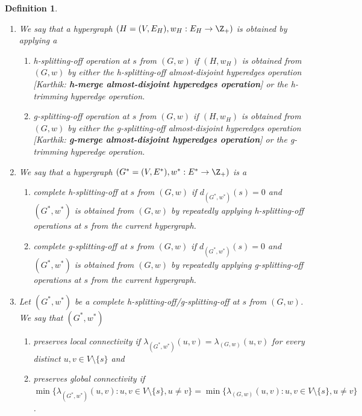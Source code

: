 \documentclass{article}
\newtheorem{definition}{Definition}[section]
\newcommand{\knote}[1]{{\color{red}[{\tiny Karthik: \bf #1}]\marginpar{\color{red}*}}}
\begin{document}
\begin{definition}
\begin{enumerate}
        
       \item We say that a hypergraph $(H=(V, E_H), w_H: E_H\rightarrow \Z_+)$ is obtained by applying a 
        \begin{enumerate}
            \item \emph{h-splitting-off operation at $s$ from $(G, w)$} if $(H, w_H)$ is obtained from $(G, w)$ by either the h-splitting-off almost-disjoint hyperedges operation \knote{h-merge almost-disjoint hyperedges operation} or the h-trimming hyperedge operation. 
            \item \emph{g-splitting-off operation at $s$ from $(G, w)$} if $(H, w_H)$ is obtained from $(G, w)$ by either the g-splitting-off almost-disjoint hyperedges operation \knote{g-merge almost-disjoint hyperedges operation} or the g-trimming hyperedge operation. 
        \end{enumerate}
        
        \item We say that a hypergraph $(G^*=(V, E^*), w^*: E^*\rightarrow \Z_+)$ is a 
        \begin{enumerate}
            \item \emph{complete h-splitting-off at $s$ from $(G, w)$} if $d_{(G^*, w^*)}(s) = 0$ and $(G^*, w^*)$ is obtained from $(G, w)$ by repeatedly applying h-splitting-off operations at $s$ from the current hypergraph. 
            \item \emph{complete g-splitting-off at $s$ from $(G, w)$} if $d_{(G^*, w^*)}(s) = 0$ and $(G^*, w^*)$ is obtained from $(G, w)$ by repeatedly applying g-splitting-off operations at $s$ from the current hypergraph. 
        \end{enumerate}

        \item Let $(G^*, w^*)$ be a complete h-splitting-off/g-splitting-off at $s$ from $(G, w)$. We say that $(G^*, w^*)$ 
        \begin{enumerate}
            \item 
            preserves local connectivity if $\lambda_{(G^*, w^*)}(u, v)=\lambda_{(G, w)}(u, v)$ for every distinct $u, v\in V\setminus\{s\}$ and 
            
            \item preserves global connectivity if \\
            $\min\{\lambda_{(G^*, w^*)}(u, v): u, v\in V\setminus \{s\}, u \neq v\}=\min\{\lambda_{(G, w)}(u, v): u, v\in V\setminus \{s\}, u \neq v\}$. 
            
        \end{enumerate}
    \end{enumerate}
\end{definition}
\fi
\end{document}
